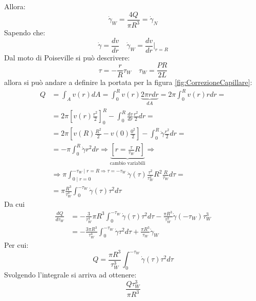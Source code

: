 Allora:
\begin{equation}
\dot{\gamma}_W  = \frac{4 Q}{\pi R^3} = \dot{\gamma}_N
\end{equation}
Sapendo che:
\begin{equation}
\dot{\gamma} = \frac{dv}{dr} \quad \dot{\gamma}_W = \frac{dv}{dr}\Big|_{r = R}
\end{equation}
Dal moto di Poiseville si può descrivere:
\begin{equation}
\tau = - \frac{r}{R}\tau_W \quad \tau_W = \frac{PR}{2L}
\end{equation}
allora si può andare a definire la portata per la figura \ref{fig:CorrezioneCapillare}:
\begin{equation}
\begin{split}
Q &= \int_A{v(r) dA} = \int_0^R{v(r) \underbrace{2\pi r dr}_{dA}} = 2\pi \int_0^R{v(r) r dr} =\\
&= 2\pi \left[v(r) \frac{r^2}{2}\right]_0^R - \int_0^R{\frac{dv}{dr}\frac{r^2}{2}dr} =\\
&= 2\pi \left[v(R)\frac{R^2}{2} - v(0)\frac{0^2}{2}\right] - \int_0^R{\dot{\gamma}\frac{r^2}{2}dr} =\\
&= -\pi \int_0^R{\dot{\gamma}r^2 dr} \Rightarrow \underbrace{\left[r = \frac{\tau}{\tau_W}R\right]}_{\text{cambio variabili}} \Rightarrow\\
&\Rightarrow \pi \int_{0 \mid r = 0}^{-\tau_W \mid r=R \Rightarrow \tau = -\tau_W}{\dot{\gamma}(\tau)\frac{\tau^2}{\tau_W^2}R^2\frac{R}{\tau_W}d\tau}=\\
&= \pi \frac{R^3}{\tau_W^3}\int_0^{-\tau_W}{\dot{\gamma}(\tau) \tau^2 d\tau}
\end{split}
\end{equation}
Da cui
\begin{equation}
\begin{split}
\frac{dQ}{d\tau_W} &= -\frac{3}{\tau_W^4}\pi R^3%
\int_0^{-\tau_W}{\dot{\gamma}(\tau)\tau^2 d\tau} - \frac{\pi R^3}{\tau_W^3} \dot{\gamma}(-\tau_W)\tau_W^3\\
&= -\frac{3\pi R^3}{\tau_W^4}\int_0^{-\tau_W}{\dot{\gamma}\tau^2 d\tau} + \frac{\pi R^3}{\tau_W}\dot{\gamma}_W
\end{split}
\end{equation}
Per cui:
\begin{equation}
Q = \frac{\pi R^3}{\tau_W^3}\int_0^{-\tau_W}{\dot{\gamma}(\tau)\tau^2 d\tau}
\end{equation}
Svolgendo l'integrale si arriva ad ottenere:
\begin{equation}
\frac{Q \tau_W^3}{\pi R^3}
\end{equation}
